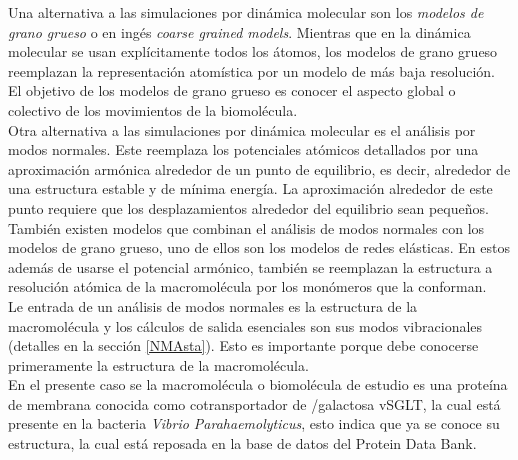 Una alternativa a las simulaciones por din\'{a}mica molecular son los \textit{modelos de grano grueso} o en ing\'{e}s \textit{coarse grained models}.  Mientras que en la din\'{a}mica molecular se usan expl\'{i}citamente todos los \'{a}tomos, los modelos de grano grueso reemplazan la representaci\'{o}n atom\'{i}stica por un modelo de m\'{a}s baja resoluci\'{o}n. El objetivo de los modelos de grano grueso es conocer el aspecto global o colectivo de los movimientos de la biomol\'{e}cula.\\

Otra alternativa a las simulaciones por din\'{a}mica molecular es el an\'{a}lisis por modos normales. Este reemplaza los potenciales at\'{o}micos detallados por una aproximaci\'{o}n arm\'{o}nica alrededor de un punto de equilibrio, es decir, alrededor de una estructura estable y de m\'{i}nima energ\'{i}a. La aproximaci\'{o}n alrededor de este punto requiere que los desplazamientos alrededor del equilibrio sean peque\~{n}os.\\

Tambi\'{e}n existen modelos que combinan el an\'{a}lisis de modos normales con los modelos de grano grueso, uno de ellos son los modelos de redes el\'{a}sticas. En estos adem\'{a}s de usarse el potencial arm\'{o}nico, tambi\'{e}n se reemplazan la estructura a resoluci\'{o}n at\'{o}mica de la macromol\'{e}cula por los mon\'{o}meros que la conforman.\\

Le entrada de un an\'{a}lisis de modos normales es la estructura de la macromol\'{e}cula y los c\'{a}lculos de salida esenciales son sus modos vibracionales (detalles en la secci\'{o}n \ref{NMAsta}). Esto es importante porque debe conocerse primeramente la estructura de la macromol\'{e}cula.\\

En el presente caso se la macromol\'{e}cula o biomol\'{e}cula de estudio es una prote\'{i}na de membrana conocida como cotransportador de /galactosa vSGLT, la cual est\'{a} presente en la bacteria \textit{Vibrio Parahaemolyticus}, esto indica que ya se conoce su estructura, la cual est\'{a} reposada en la base de datos del Protein Data Bank.